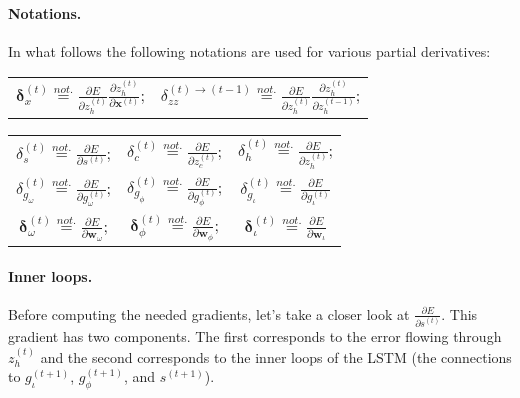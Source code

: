 \documentclass[11pt]{article}
\begin{document}
\paragraph{Notations.} In what follows the following notations are used for various partial derivatives:

\begin{center}
\begin{tabular}{c c}
    $\boldsymbol{\delta}_{x}^{(t)} \overset{not.}{=} \displaystyle\frac{\partial E}{\partial z_h^{(t)}}\displaystyle\frac{\partial z_h^{(t)}} {\partial \mathbf{x}^{(t)}}$; &
    $\delta_{zz}^{(t)\rightarrow(t-1)} \overset{not.}{=} \displaystyle\frac{\partial E}{\partial z_h^{(t)}}\displaystyle\frac{\partial z_h^{(t)}} {\partial z_h^{(t-1)}}$; \\[20pt]
\end{tabular}
\begin{tabular}{c c c}
    $\delta_{s}^{(t)} \overset{not.}{=} \displaystyle\frac{\partial E}{\partial s^{(t)}}$; &
    $\delta_{c}^{(t)} \overset{not.}{=} \displaystyle\frac{\partial E}{\partial z_c^{(t)}}$; &
    $\delta_{h}^{(t)} \overset{not.}{=} \displaystyle\frac{\partial E}{\partial z_h^{(t)}}$;  \\[20pt]
    $\delta_{g_{\omega}}^{(t)} \overset{not.}{=} \displaystyle\frac{\partial E}{\partial g_{\omega}^{(t)}}$; &
    $\delta_{g_{\phi}}^{(t)} \overset{not.}{=} \displaystyle\frac{\partial E}{\partial g_{\phi}^{(t)}}$; &
    $\delta_{g_{\iota}}^{(t)} \overset{not.}{=} \displaystyle\frac{\partial E}{\partial g_{\iota}^{(t)}}$ \\[20pt]
    $\boldsymbol{\delta}_{\omega}^{(t)} \overset{not.}{=} \displaystyle\frac{\partial E}{\partial \mathbf{w}_{\omega}}$; &
    $\boldsymbol{\delta}_{\phi}^{(t)} \overset{not.}{=} \displaystyle\frac{\partial E}{\partial \mathbf{w}_{\phi}}$; &
    $\boldsymbol{\delta}_{\iota}^{(t)} \overset{not.}{=} \displaystyle\frac{\partial E}{\partial \mathbf{w}_{\iota}}$
\end{tabular}
\end{center}

\paragraph{Inner loops.} Before computing the needed gradients, let's take a closer look at $\frac{\partial E}{\partial s^{(t)}}$. This gradient has two components. The first corresponds to the error flowing through $z_h^{(t)}$ and the second corresponds to the inner loops of the LSTM (the connections to $g_{\iota}^{(t+1)}$, $g_{\phi}^{(t+1)}$, and $s^{(t+1)}$).
\end{document}
